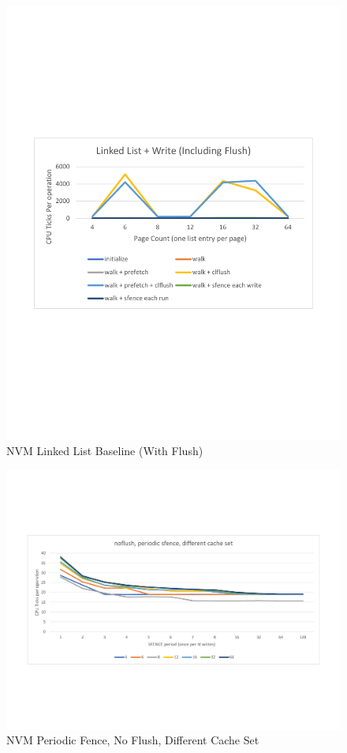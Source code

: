 \begin{figure}
    \centering
    \caption{NVM Linked List Baseline (With Flush)}\label{micro:llbaseline:flush}
    \includegraphics[scale=0.35]{micro/nvm-linked-list-baseline-with-flush.pdf}
\end{figure}

\begin{figure}
    \centering
    \caption{NVM Periodic Fence, No Flush, Different Cache Set}\label{micro:sfence:noflush:different}
    \includegraphics[scale=0.35]{micro/nvm-noflush-periodic-different.pdf}
\end{figure}

